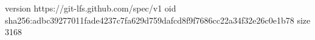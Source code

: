 version https://git-lfs.github.com/spec/v1
oid sha256:adbc39277011fade4237c7fa629d759dafcd8f9f7686cc22a34f32e26c0e1b78
size 3168

